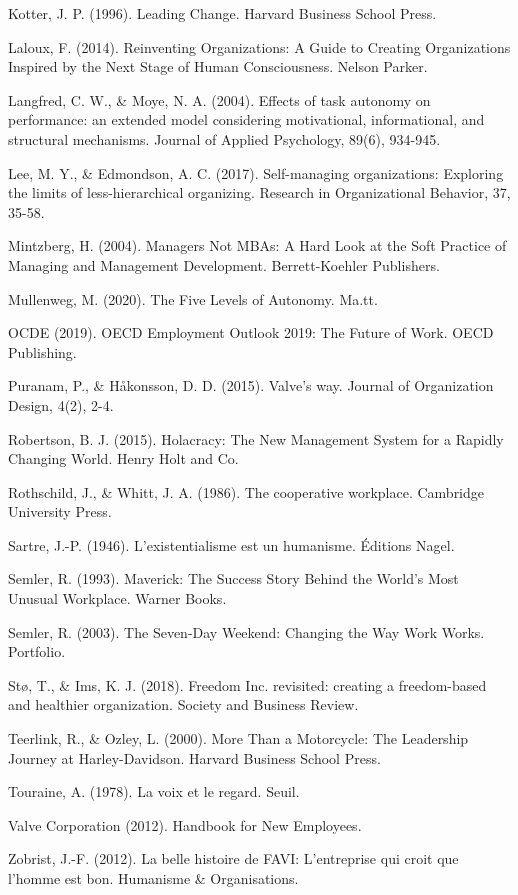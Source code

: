Kotter, J. P. (1996). Leading Change. Harvard Business School Press.

Laloux, F. (2014). Reinventing Organizations: A Guide to Creating Organizations Inspired by the Next Stage of Human Consciousness. Nelson Parker.

Langfred, C. W., \& Moye, N. A. (2004). Effects of task autonomy on performance: an extended model considering motivational, informational, and structural mechanisms. Journal of Applied Psychology, 89(6), 934-945.

Lee, M. Y., \& Edmondson, A. C. (2017). Self-managing organizations: Exploring the limits of less-hierarchical organizing. Research in Organizational Behavior, 37, 35-58.

Mintzberg, H. (2004). Managers Not MBAs: A Hard Look at the Soft Practice of Managing and Management Development. Berrett-Koehler Publishers.

Mullenweg, M. (2020). The Five Levels of Autonomy. Ma.tt.

OCDE (2019). OECD Employment Outlook 2019: The Future of Work. OECD Publishing.

Puranam, P., \& Håkonsson, D. D. (2015). Valve's way. Journal of Organization Design, 4(2), 2-4.

Robertson, B. J. (2015). Holacracy: The New Management System for a Rapidly Changing World. Henry Holt and Co.

Rothschild, J., \& Whitt, J. A. (1986). The cooperative workplace. Cambridge University Press.

Sartre, J.-P. (1946). L'existentialisme est un humanisme. Éditions Nagel.

Semler, R. (1993). Maverick: The Success Story Behind the World's Most Unusual Workplace. Warner Books.

Semler, R. (2003). The Seven-Day Weekend: Changing the Way Work Works. Portfolio.

Stø, T., \& Ims, K. J. (2018). Freedom Inc. revisited: creating a freedom-based and healthier organization. Society and Business Review.

Teerlink, R., \& Ozley, L. (2000). More Than a Motorcycle: The Leadership Journey at Harley-Davidson. Harvard Business School Press.

Touraine, A. (1978). La voix et le regard. Seuil.

Valve Corporation (2012). Handbook for New Employees.

Zobrist, J.-F. (2012). La belle histoire de FAVI: L'entreprise qui croit que l'homme est bon. Humanisme \& Organisations.

\endgroup
